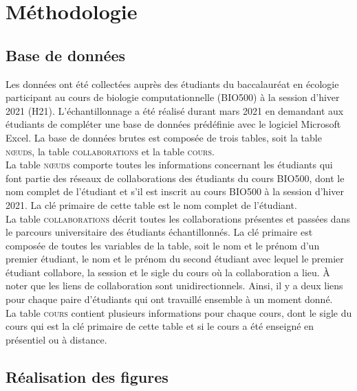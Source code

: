 \documentclass{article}
\begin{document}
\section*{Méthodologie}

\subsection*{Base de données}
    Les données ont été collectées auprès des étudiants du baccalauréat en écologie participant au cours de biologie computationnelle (BIO500) à la session d’hiver 2021 (H21). L’échantillonnage a été réalisé durant mars 2021 en demandant aux étudiants de compléter une base de données prédéfinie avec le logiciel Microsoft Excel. La base de données brutes est composée de trois tables, soit la table \textsc{nœuds}, la table \textsc{collaborations} et la table \textsc{cours}.\\
    La table \textsc{nœuds} comporte toutes les informations concernant les étudiants qui font partie des réseaux de collaborations des étudiants du cours BIO500, dont le nom complet de l’étudiant et s’il est inscrit au cours BIO500 à la session d’hiver 2021. La clé primaire de cette table est le nom complet de l’étudiant.\\
    La table \textsc{collaborations} décrit toutes les collaborations présentes et passées dans le parcours universitaire des étudiants échantillonnés. La clé primaire est composée de toutes les variables de la table, soit le nom et le prénom d’un premier étudiant, le nom et le prénom du second étudiant avec lequel le premier étudiant collabore, la session et le sigle du cours où la collaboration a lieu. À noter que les liens de collaboration sont unidirectionnels. Ainsi, il y a deux liens pour chaque paire d’étudiants qui ont travaillé ensemble à un moment donné.\\
    La table \textsc{cours} contient plusieurs informations pour chaque cours, dont le sigle du cours qui est la clé primaire de cette table et si le cours a été enseigné en présentiel ou à distance.

\subsection*{Réalisation des figures}
\end{document}
